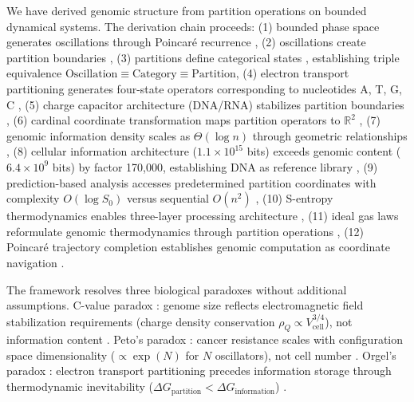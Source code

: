 \documentclass[11pt,a4paper]{article}
\theoremstyle{remark}
\begin{document}
We have derived genomic structure from partition operations on bounded dynamical systems. The derivation chain proceeds: (1) bounded phase space generates oscillations through Poincaré recurrence \citep{poincare1890probleme, birkhoff1931proof}, (2) oscillations create partition boundaries \citep{arnold1978mathematical}, (3) partitions define categorical states \citep{kolmogorov1957theory}, establishing triple equivalence $\text{Oscillation} \equiv \text{Category} \equiv \text{Partition}$, (4) electron transport partitioning generates four-state operators corresponding to nucleotides A, T, G, C \citep{mitchell1961coupling, nicholls2013bioenergetics}, (5) charge capacitor architecture (DNA/RNA) stabilizes partition boundaries \citep{watson1953molecular, bloomfield1997dna}, (6) cardinal coordinate transformation maps partition operators to $\mathbb{R}^2$ \citep{nandy2006graphical, yau2003dna}, (7) genomic information density scales as $\Theta(\log n)$ through geometric relationships \citep{shannon1948mathematical, schneider1986information}, (8) cellular information architecture ($1.1 \times 10^{15}$ bits) exceeds genomic content ($6.4 \times 10^9$ bits) by factor 170,000, establishing DNA as reference library \citep{elowitz2002stochastic, larsson2019genomic}, (9) prediction-based analysis accesses predetermined partition coordinates with complexity $O(\log S_0)$ versus sequential $O(n^2)$ \citep{altschul1990basic, landauer1961irreversibility}, (10) S-entropy thermodynamics enables three-layer processing architecture \citep{callen1985thermodynamics, jarzynski1997nonequilibrium}, (11) ideal gas laws reformulate genomic thermodynamics through partition operations \citep{reif1965fundamentals}, (12) Poincaré trajectory completion establishes genomic computation as coordinate navigation \citep{poincare1890probleme}.

The framework resolves three biological paradoxes without additional assumptions. C-value paradox \citep{gregory2001coincidence, gregory2005genome}: genome size reflects electromagnetic field stabilization requirements (charge density conservation $\rho_Q \propto V_{\text{cell}}^{3/4}$), not information content \citep{Sachikonye2025_CValue}. Peto's paradox \citep{peto1977naturally, caulin2015petos}: cancer resistance scales with configuration space dimensionality ($\propto \exp(N)$ for $N$ oscillators), not cell number \citep{Sachikonye2025_Peto}. Orgel's paradox \citep{orgel1968evolution, orgel2004prebiotic}: electron transport partitioning precedes information storage through thermodynamic inevitability ($\Delta G_{\text{partition}} < \Delta G_{\text{information}}$) \citep{russell2007alkaline, Sachikonye2025_Origins}.
\end{document}
